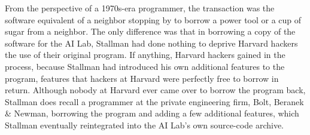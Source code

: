 


\ifdefined\eng
From the perspective of a 1970s-era programmer, the transaction was the software equivalent of a neighbor stopping by to borrow a power tool or a cup of sugar from a neighbor. The only difference was that in borrowing a copy of the software for the AI Lab, Stallman had done nothing to deprive Harvard hackers the use of their original program. If anything, Harvard hackers gained in the process, because Stallman had introduced his own additional features to the program, features that hackers at Harvard were perfectly free to borrow in return. Although nobody at Harvard ever came over to borrow the program back, Stallman does recall a programmer at the private engineering firm, Bolt, Beranek \& Newman, borrowing the program and adding a few additional features, which Stallman eventually reintegrated into the AI Lab's own source-code archive.
\fi


